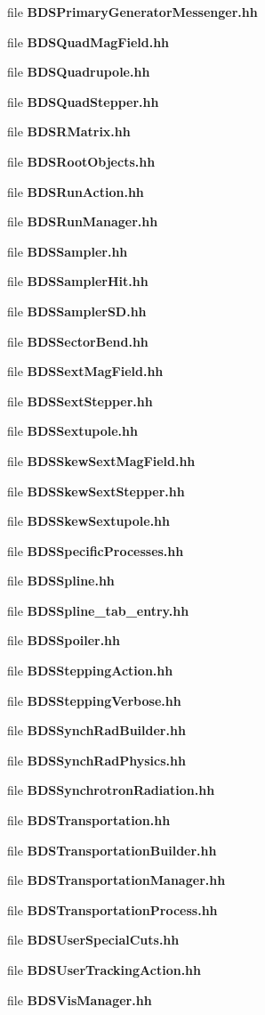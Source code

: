 \begin{CompactItemize}
file {\bf BDSPrimaryGeneratorMessenger.hh}
\item 
file {\bf BDSQuadMagField.hh}
\item 
file {\bf BDSQuadrupole.hh}
\item 
file {\bf BDSQuadStepper.hh}
\item 
file {\bf BDSRMatrix.hh}
\item 
file {\bf BDSRootObjects.hh}
\item 
file {\bf BDSRunAction.hh}
\item 
file {\bf BDSRunManager.hh}
\item 
file {\bf BDSSampler.hh}
\item 
file {\bf BDSSamplerHit.hh}
\item 
file {\bf BDSSamplerSD.hh}
\item 
file {\bf BDSSectorBend.hh}
\item 
file {\bf BDSSextMagField.hh}
\item 
file {\bf BDSSextStepper.hh}
\item 
file {\bf BDSSextupole.hh}
\item 
file {\bf BDSSkewSextMagField.hh}
\item 
file {\bf BDSSkewSextStepper.hh}
\item 
file {\bf BDSSkewSextupole.hh}
\item 
file {\bf BDSSpecificProcesses.hh}
\item 
file {\bf BDSSpline.hh}
\item 
file {\bf BDSSpline_tab_entry.hh}
\item 
file {\bf BDSSpoiler.hh}
\item 
file {\bf BDSSteppingAction.hh}
\item 
file {\bf BDSSteppingVerbose.hh}
\item 
file {\bf BDSSynchRadBuilder.hh}
\item 
file {\bf BDSSynchRadPhysics.hh}
\item 
file {\bf BDSSynchrotronRadiation.hh}
\item 
file {\bf BDSTransportation.hh}
\item 
file {\bf BDSTransportationBuilder.hh}
\item 
file {\bf BDSTransportationManager.hh}
\item 
file {\bf BDSTransportationProcess.hh}
\item 
file {\bf BDSUserSpecialCuts.hh}
\item 
file {\bf BDSUserTrackingAction.hh}
\item 
file {\bf BDSVisManager.hh}

\end{CompactItemize}
